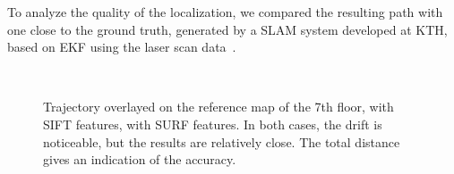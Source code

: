 \clearpage
To analyze the quality of the localization, we compared the resulting path with one close to the ground truth, generated by a \gls{SLAM} system developed at KTH, based on \gls{EKF} using the laser scan data~\cite{Folkesson_07}.
\begin{figure}[H]
\centering
{} \\
\caption{Trajectory overlayed on the reference map of the 7th floor, \protect{} with SIFT features, \protect{} with SURF features. In both cases, the drift is noticeable, but the results are relatively close. The total distance gives an indication of the accuracy.}
\label{fig:plan_cvap}
\end{figure}

